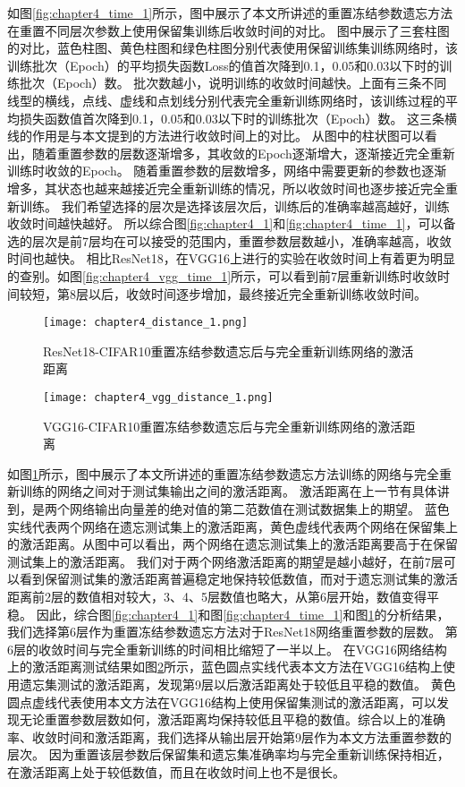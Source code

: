 如图\ref{fig:chapter4_time_1}所示，图中展示了本文所讲述的重置冻结参数遗忘方法在重置不同层次参数上使用保留集训练后收敛时间的对比。
图中展示了三套柱图的对比，蓝色柱图、黄色柱图和绿色柱图分别代表使用保留训练集训练网络时，该训练批次（Epoch）的平均损失函数Loss的值首次降到0.1，0.05和0.03以下时的训练批次（Epoch）数。
批次数越小，说明训练的收敛时间越快。上面有三条不同线型的横线，点线、虚线和点划线分别代表完全重新训练网络时，该训练过程的平均损失函数值首次降到0.1，0.05和0.03以下时的训练批次（Epoch）数。
这三条横线的作用是与本文提到的方法进行收敛时间上的对比。
从图中的柱状图可以看出，随着重置参数的层数逐渐增多，其收敛的Epoch逐渐增大，逐渐接近完全重新训练时收敛的Epoch。
随着重置参数的层数增多，网络中需要更新的参数也逐渐增多，其状态也越来越接近完全重新训练的情况，所以收敛时间也逐步接近完全重新训练。
我们希望选择的层次是选择该层次后，训练后的准确率越高越好，训练收敛时间越快越好。
所以综合图\ref{fig:chapter4_1}和\ref{fig:chapter4_time_1}，可以备选的层次是前7层均在可以接受的范围内，重置参数层数越小，准确率越高，收敛时间也越快。
相比ResNet18，在VGG16上进行的实验在收敛时间上有着更为明显的查别。如图\ref{fig:chapter4_vgg_time_1}所示，可以看到前7层重新训练时收敛时间较短，第8层以后，收敛时间逐步增加，最终接近完全重新训练收敛时间。
\begin{figure}
    \centering
    \texttt{[image: chapter4\_distance\_1.png]}
    \caption{ResNet18-CIFAR10重置冻结参数遗忘后与完全重新训练网络的激活距离}
    \label{fig:chapter4_distance_1}
\end{figure}

\begin{figure}
    \centering
    \texttt{[image: chapter4\_vgg\_distance\_1.png]}
    \caption{VGG16-CIFAR10重置冻结参数遗忘后与完全重新训练网络的激活距离}
    \label{fig:chapter4_vgg_distance_1}
\end{figure}

如图\ref{fig:chapter4_distance_1}所示，图中展示了本文所讲述的重置冻结参数遗忘方法训练的网络与完全重新训练的网络之间对于测试集输出之间的激活距离。
激活距离在上一节有具体讲到，是两个网络输出向量差的绝对值的第二范数值在测试数据集上的期望。
蓝色实线代表两个网络在遗忘测试集上的激活距离，黄色虚线代表两个网络在保留集上的激活距离。从图中可以看出，两个网络在遗忘测试集上的激活距离要高于在保留测试集上的激活距离。
我们对于两个网络激活距离的期望是越小越好，在前7层可以看到保留测试集的激活距离普遍稳定地保持较低数值，而对于遗忘测试集的激活距离前2层的数值相对较大，3、4、5层数值也略大，从第6层开始，数值变得平稳。
因此，综合图\ref{fig:chapter4_1}和图\ref{fig:chapter4_time_1}和图\ref{fig:chapter4_distance_1}的分析结果，我们选择第6层作为重置冻结参数遗忘方法对于ResNet18网络重置参数的层数。
第6层的收敛时间与完全重新训练的时间相比缩短了一半以上。
在VGG16网络结构上的激活距离测试结果如图\ref{fig:chapter4_vgg_distance_1}所示，蓝色圆点实线代表本文方法在VGG16结构上使用遗忘集测试的激活距离，发现第9层以后激活距离处于较低且平稳的数值。
黄色圆点虚线代表使用本文方法在VGG16结构上使用保留集测试的激活距离，可以发现无论重置参数层数如何，激活距离均保持较低且平稳的数值。综合以上的准确率、收敛时间和激活距离，我们选择从输出层开始第9层作为本文方法重置参数的层次。
因为重置该层参数后保留集和遗忘集准确率均与完全重新训练保持相近，在激活距离上处于较低数值，而且在收敛时间上也不是很长。


